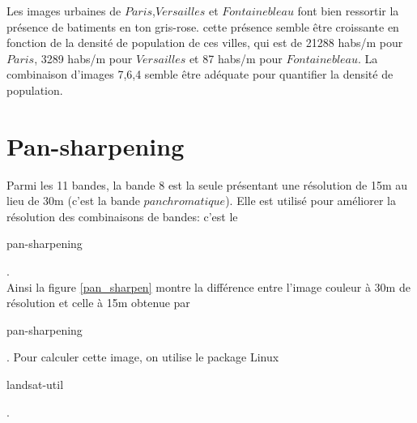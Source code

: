\documentclass{book}
\begin{document}
\clearpage

Les images urbaines de $Paris$,$Versailles$ et $Fontainebleau$ font bien ressortir la présence de batiments en ton gris-rose. cette présence
semble être croissante en fonction de la densité de population de ces villes, qui est de 21288 habs/m pour $Paris$, 3289 habs/m
pour $Versailles$ et 87 habs/m pour $Fontainebleau$. La combinaison d'images 7,6,4 semble être adéquate pour quantifier la densité
de population.

\section{Pan-sharpening}

Parmi les 11 bandes, la bande 8 est la seule présentant une résolution de 15m au lieu de 30m (c'est la bande $panchromatique$). 
Elle est utilisé pour améliorer la résolution
des combinaisons de bandes: c'est le \begin{itshape}pan-sharpening\end{itshape}.\\
Ainsi la figure \ref{pan_sharpen} montre la différence entre l'image couleur à 30m de résolution et celle à 15m obtenue par \begin{itshape}pan-sharpening\end{itshape}.
Pour calculer cette image, on utilise le package Linux \begin{itshape}landsat-util\end{itshape} \cite{dans-gdal}.
\end{document}
